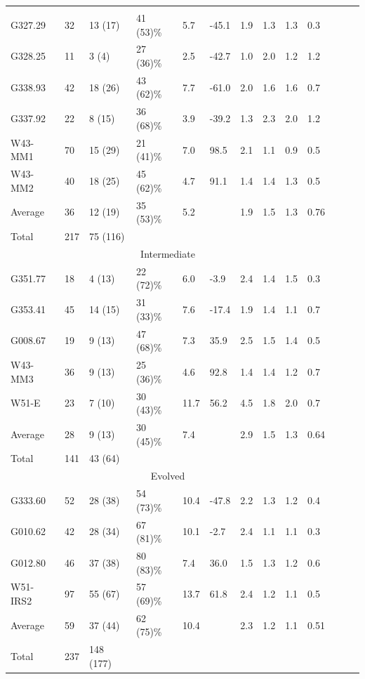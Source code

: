 \documentclass[longauth]{aa} %
\begin{document}
\begin{table}[htbp!]
\begin{threeparttable}[c]
\begin{tabular}{lllllllllllll}
\hline \noalign {\smallskip}
\multicolumn{10}{c}{Young} \\
G327.29 & 32 & 13 (17)&  41 (53)\% & 5.7 & -45.1 & 1.9  & 1.3 & 1.3 & 0.3 \\
G328.25 & 11 & 3  (4)&  27 (36)\% & 2.5 & -42.7 & 1.0  & 2.0 & 1.2 & 1.2 \\
G338.93 & 42 & 18 (26)&  43 (62)\% & 7.7 & -61.0 & 2.0  & 1.6 & 1.6 & 0.7 \\
G337.92 & 22 & 8  (15)&  36 (68)\% & 3.9 & -39.2 & 1.3  & 2.3 & 2.0 & 1.2 \\
W43-MM1 & 70 & 15 (29)&  21 (41)\% & 7.0 & 98.5 & 2.1  & 1.1 & 0.9 & 0.5 \\
W43-MM2 & 40 & 18 (25)&  45 (62)\% & 4.7 & 91.1 & 1.4  & 1.4 & 1.3 & 0.5 \\
Average &  36 & 12 (19) & 35 (53)\% &  5.2 &  & 1.9  & 1.5 & 1.3 & 0.76 \\
Total &  217 & 75 (116)  \\
\hline
\multicolumn{10}{c}{Intermediate} \\
G351.77 & 18 & 4  (13)&  22 (72)\% & 6.0 & -3.9 & 2.4  & 1.4 & 1.5 & 0.3 \\
G353.41 & 45 & 14 (15)&  31 (33)\% & 7.6 & -17.4 & 1.9  & 1.4 & 1.1 & 0.7 \\
G008.67 & 19 & 9  (13)&  47 (68)\% & 7.3 & 35.9 & 2.5  & 1.5 & 1.4 & 0.5 \\
W43-MM3 & 36 & 9  (13)&  25 (36)\% & 4.6 & 92.8 & 1.4  & 1.4 & 1.2 & 0.7 \\
W51-E & 23 & 7  (10)&  30 (43)\% & 11.7 & 56.2 & 4.5  & 1.8 & 2.0 & 0.7 \\
Average &  28 & 9  (13) & 30 (45)\% &  7.4 &  & 2.9  & 1.5 & 1.3 & 0.64 \\
Total &  141 & 43 (64)  \\
\hline
\multicolumn{10}{c}{Evolved} \\
G333.60 &  52 & 28 (38) &  54 (73)\% & 10.4 & -47.8 & 2.2  & 1.3 & 1.2 & 0.4 \\
G010.62 &  42 & 28 (34) &  67 (81)\% & 10.1 & -2.7 & 2.4  & 1.1 & 1.1 & 0.3 \\
G012.80 &  46 & 37 (38) &  80 (83)\% & 7.4 & 36.0 & 1.5  & 1.3 & 1.2 & 0.6 \\
W51-IRS2 &  97 & 55 (67) &  57 (69)\% & 13.7 & 61.8 & 2.4  & 1.2 & 1.1 & 0.5 \\
Average &  59 & 37 (44) & 62 (75)\% &  10.4 &  & 2.3  & 1.2 & 1.1 & 0.51 \\
Total &  237 & 148 (177)  \\


\end{tabular}
\end{threeparttable}
\end{table}
\end{document}
